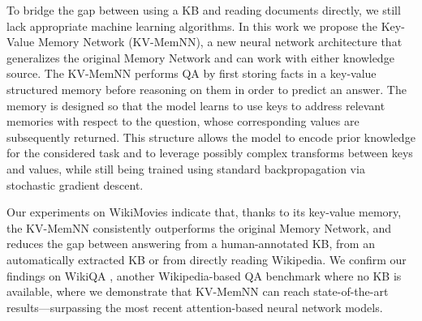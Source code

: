To bridge the gap between using a KB and reading documents directly,
we still lack appropriate machine learning algorithms. In this
work we propose the Key-Value Memory Network (KV-MemNN), a new neural network
architecture that generalizes the original Memory Network
\citep{sukhbaatar2015end} and can work with either knowledge source.
%
The KV-MemNN performs QA by first storing facts in a key-value
structured memory before reasoning on them in order to predict an
answer. The memory is designed so that the model learns to use keys to
address relevant memories with respect to the question, whose corresponding values are subsequently returned.
%
This structure allows the model to encode prior knowledge for the considered task
and to leverage possibly complex transforms between keys and values,
while still being trained using standard backpropagation via
stochastic gradient descent.

Our experiments on {\sc WikiMovies} indicate that, thanks to its key-value memory,
the KV-MemNN consistently outperforms the
original Memory Network, and reduces the gap between answering from a human-annotated KB,
from an automatically extracted KB or from directly reading Wikipedia.
%
We confirm our findings on  {\sc WikiQA} \citep{yang2015wikiqa},
another Wikipedia-based QA benchmark where no KB is available,
where we demonstrate that KV-MemNN can reach state-of-the-art results---surpassing
the most recent attention-based neural network models.
